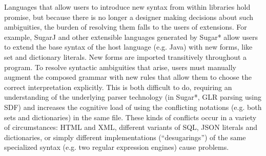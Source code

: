 Languages that allow users to introduce new syntax from within libraries hold promise, but because there is no longer a designer making decisions about such ambiguities, the burden of resolving them falls to the users of extensions. For example, SugarJ \cite{Erdweg:2011:SLL:2048147.2048199} and other extensible languages generated by Sugar* \cite{Erdweg:2013:FEL:2517208.2517210} allow users to extend the base syntax of the host language (e.g. Java) with new forms, like set and dictionary literals. New forms are imported transitively throughout a program. To resolve syntactic ambiguities that arise, users must manually augment the composed grammar with new rules that allow them to choose the correct interpretation explicitly. This is both difficult to do, requiring an understanding of the underlying parser technology (in Sugar*, GLR parsing using SDF) and increases the cognitive load of using the conflicting notations (e.g. both sets and dictionaries) in the same file. These kinds of conflicts occur in a variety of circumstances: HTML and XML, different variants of SQL, JSON literals and dictionaries, or simply different implementations (``desugarings'') of the same specialized syntax (e.g. two regular expression engines) cause problems.

